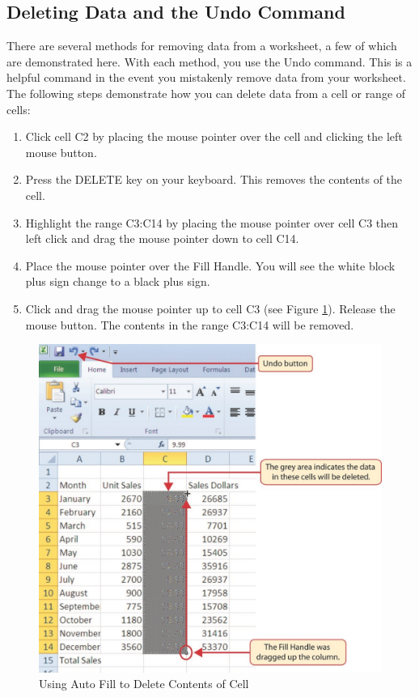 \subsection{Deleting Data and the Undo Command}

There are several methods for removing data from a worksheet, a few of which are demonstrated here. With each method, you use the Undo command. This is a helpful command in the event you mistakenly remove data from your worksheet. The following steps demonstrate how you can delete data from a cell or range of cells:

\begin{enumerate}
	\item Click cell \textsf{C2} by placing the mouse pointer over the cell and clicking the left mouse button.
	\item Press the DELETE key on your keyboard. This removes the contents of the cell.
	\item Highlight the range \textsf{C3:C14} by placing the mouse pointer over cell \textsf{C3} then left click and drag the mouse pointer down to cell \textsf{C14}.
	\item Place the mouse pointer over the Fill Handle. You will see the white block plus sign change to a black plus sign.
	\item Click and drag the mouse pointer up to cell \textsf{C3} (see Figure \ref{01:fig21}). Release the mouse button. The contents in the range \textsf{C3:C14} will be removed.
\end{enumerate}

\begin{figure}[H]
	\centering
	\includegraphics[width=\maxwidth{.95\linewidth}]{gfx/ch01_fig21}
	\caption{Using Auto Fill to Delete Contents of Cell}
	\label{01:fig21}
\end{figure}

